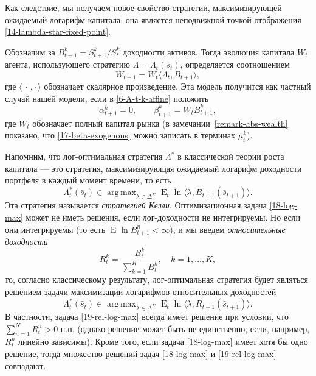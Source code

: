 \documentclass[a4paper,12pt,russian]{article} %
\theoremstyle{definition}
\DeclareMathOperator{\E}{E}
\DeclareMathOperator{\argmax}{arg\,max}
\begin{document}
Как следствие, мы получаем новое свойство стратегии, максимизирующей ожидаемый логарифм капитала: она является неподвижной точкой отображения \eqref{14-lambda-star-fixed-point}.

Обозначим за  $B_{t+1}^k = S_{t+1}^k/S_{t}^k$ доходности активов.
Тогда эволюция капитала $W_t$ агента, использующего стратегию $\Lambda = \Lambda_t(\bar s_t)$, определяется соотношением
\[
W_{t+1} = W_t \langle \Lambda_t, B_{t+1}\rangle,
\]
где $\langle\,\cdot\,,\cdot\,\rangle$ обозначает скалярное произведение.
Эта модель получится как частный случай нашей модели, если в \eqref{6-A-t-k-affine} положить 
\begin{equation}
\label{17-beta-exogenous}
\alpha_{t+1}^k = 0, \qquad \beta_{t+1}^k = W_t B_{t+1}^k,
\end{equation}
где $W_t$ обозначает полный капитал рынка (в замечании~\ref{remark-abs-wealth} показано, что  \eqref{17-beta-exogenous} можно записать в терминах $\mu_{t}^k$).

Напомним, что лог-оптимальная стратегия $\Lambda^*$ в классической теории роста капитала — это стратегия, максимизирующая ожидаемый логарифм доходности портфеля в каждый момент времени, то есть 
\begin{equation}
\label{18-log-max}
\Lambda_t^*(\bar s_t) 
\in \argmax_{\lambda\in \Delta^K} 
  \E_t \ln\langle \lambda, B_{t+1}(\bar s_{t+1})\rangle.
\end{equation}
Эта стратегия называется \emph{стратегией Келли}.
Оптимизационная задача \eqref{18-log-max} может не иметь решения, если лог-доходности не интегрируемы. Но если они интегрируемы (то есть $\E \ln B_{t+1}^n < \infty$), и мы введем \emph{относительные доходности}
\[
R_{t}^k = \frac{B_{t}^k}{\sum_{k=1}^K B_{t}^k}, \quad k=1,\dots,K,
\]
то, согласно классическому результату, лог-оптимальная стратегия будет являться решением задачи максимизации логарифмов относительных доходностей
\begin{equation}
\label{19-rel-log-max}
\Lambda^*_t(\bar s_t) 
\in \argmax_{\lambda\in \Delta^K} 
  \E_t \ln\langle \lambda, R_{t+1}(\bar s_{t+1})\rangle.
\end{equation}
В частности, задача \eqref{19-rel-log-max} всегда имеет решение при условии, что 
$\sum_{n=1}^N R_t^n > 0$ п.н. (однако решение может быть не единственно, если, например, $R_t^n$ линейно зависимы). Кроме того, если задача  \eqref{18-log-max} имеет хотя бы одно решение, тогда множество решений задач \eqref{18-log-max} и \eqref{19-rel-log-max} совпадают. 
\end{document}
